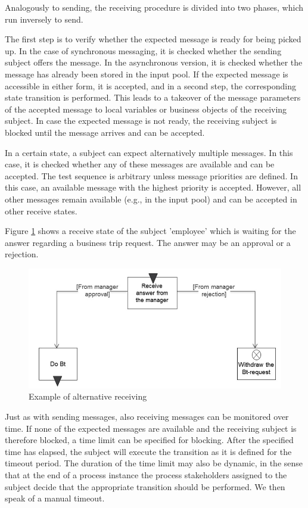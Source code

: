 Analogously to sending, the receiving procedure is divided into two phases, which run inversely to send.

The first step is to verify whether the expected message is ready for being picked up. In the case of synchronous messaging, it is checked whether the sending subject offers the message. In the asynchronous version, it is checked whether the message has already been stored in the input pool. If the expected message is accessible in either form, it is accepted, and in a second step, the corresponding state transition is performed. This leads to a takeover of the message parameters of the accepted message to local variables or business objects of the receiving subject. In case the expected message is not ready, the receiving subject is blocked until the message arrives and can be accepted.

In a certain state, a subject can expect alternatively multiple messages. In this case, it is checked whether any of these messages are available and can be accepted. The test sequence is arbitrary unless message priorities are defined. In this case, an available message with the highest priority is accepted. However, all other messages remain available (e.g., in the input pool) and can be accepted in other receive states.

Figure \ref{fig:receivestate} shows a receive state of the subject 'employee' which is waiting for the answer regarding a business trip request. The answer may be an approval or a rejection.

\begin{figure}[htbp]
	\centering
	\includegraphics[width=0.7\linewidth]{Figures/Ontology/SubjectExecution/ReceiveState}
	\caption[Example of alternative receiving]{Example of alternative receiving}
	\label{fig:receivestate}
\end{figure}

Just as with sending messages, also receiving messages can be monitored over time. If none of the expected messages are available and the receiving subject is therefore blocked, a time limit can be specified for blocking. After the specified time has elapsed, the subject will execute the transition as it is defined for the timeout period. The duration of the time limit may also be dynamic, in the sense that at the end of a process instance the process stakeholders assigned to the subject decide that the appropriate transition should be performed. We then speak of a manual timeout.

